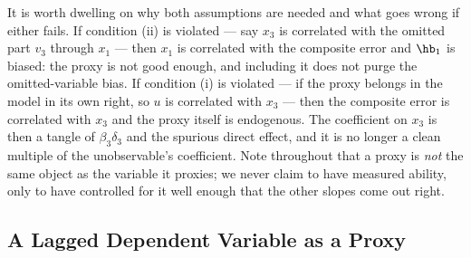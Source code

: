 

It is worth dwelling on why both assumptions are needed and what goes wrong if either fails. If condition (ii) is violated --- say $x_3$ is correlated with the omitted part $v_3$ through $x_1$ --- then $x_1$ is correlated with the composite error and $\hb_1$ is biased: the proxy is not good enough, and including it does not purge the omitted-variable bias. If condition (i) is violated --- if the proxy belongs in the model in its own right, so $u$ is correlated with $x_3$ --- then the composite error is correlated with $x_3$ and the proxy itself is endogenous. The coefficient on $x_3$ is then a tangle of $\beta_3\delta_3$ and the spurious direct effect, and it is no longer a clean multiple of the unobservable's coefficient. Note throughout that a proxy is \emph{not} the same object as the variable it proxies; we never claim to have measured ability, only to have controlled for it well enough that the other slopes come out right.

\subsection{A Lagged Dependent Variable as a Proxy}


